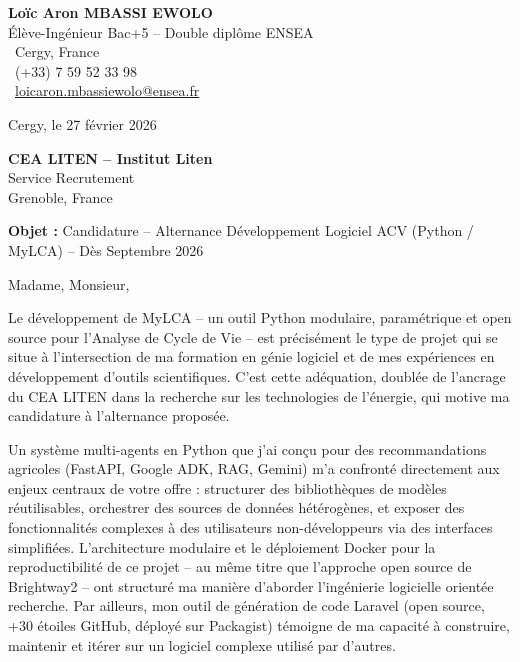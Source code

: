 \documentclass[a4paper,11pt]{article}
\begin{document}
\noindent
\begin{minipage}[t]{0.5\textwidth}
    \textbf{Loïc Aron MBASSI EWOLO}\\
    Élève-Ingénieur Bac+5 -- Double diplôme ENSEA\\[3pt]
    \faMapMarker\ Cergy, France\\
    \faPhone\ (+33) 7 59 52 33 98\\
    \faEnvelope\ \href{mailto:loicaron.mbassiewolo@ensea.fr}{loicaron.mbassiewolo@ensea.fr}
\end{minipage}
\hfill
\begin{minipage}[t]{0.4\textwidth}
    \raggedleft
    Cergy, le 27 février 2026
\end{minipage}

\vspace{1.2cm}

\hfill
\begin{minipage}[t]{0.5\textwidth}
    \raggedleft
    \textbf{CEA LITEN -- Institut Liten}\\
    Service Recrutement\\
    Grenoble, France
\end{minipage}

\vspace{1cm}

\noindent\textbf{Objet :} Candidature -- Alternance Développement Logiciel ACV (Python / MyLCA) -- Dès Septembre 2026

\vspace{0.8cm}

Madame, Monsieur,

Le développement de MyLCA -- un outil Python modulaire, paramétrique et open source pour l'Analyse de Cycle de Vie -- est précisément le type de projet qui se situe à l'intersection de ma formation en génie logiciel et de mes expériences en développement d'outils scientifiques. C'est cette adéquation, doublée de l'ancrage du CEA LITEN dans la recherche sur les technologies de l'énergie, qui motive ma candidature à l'alternance proposée.

Un système multi-agents en Python que j'ai conçu pour des recommandations agricoles (FastAPI, Google ADK, RAG, Gemini) m'a confronté directement aux enjeux centraux de votre offre : structurer des bibliothèques de modèles réutilisables, orchestrer des sources de données hétérogènes, et exposer des fonctionnalités complexes à des utilisateurs non-développeurs via des interfaces simplifiées. L'architecture modulaire et le déploiement Docker pour la reproductibilité de ce projet -- au même titre que l'approche open source de Brightway2 -- ont structuré ma manière d'aborder l'ingénierie logicielle orientée recherche. Par ailleurs, mon outil de génération de code Laravel (open source, +30 étoiles GitHub, déployé sur Packagist) témoigne de ma capacité à construire, maintenir et itérer sur un logiciel complexe utilisé par d'autres.
\end{document}
